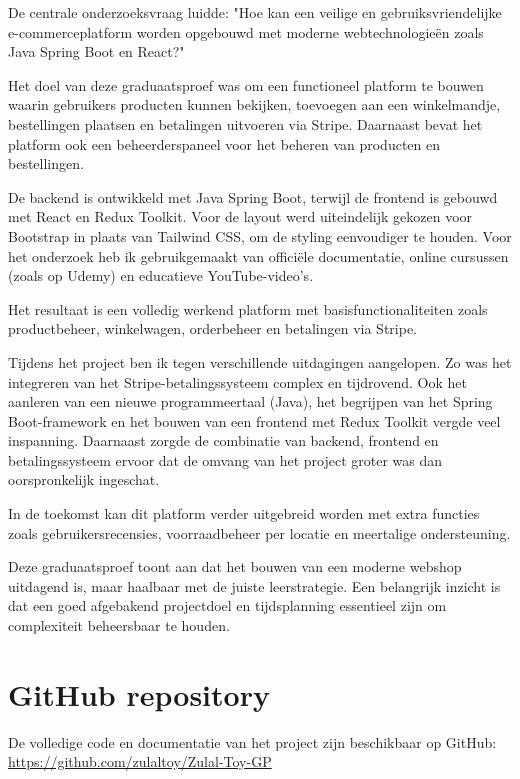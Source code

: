 De centrale onderzoeksvraag luidde: "Hoe kan een veilige en gebruiksvriendelijke e-commerceplatform worden opgebouwd met moderne webtechnologieën zoals Java Spring Boot en React?"

Het doel van deze graduaatsproef was om een functioneel platform te bouwen waarin gebruikers producten kunnen bekijken, toevoegen aan een winkelmandje, bestellingen plaatsen en betalingen uitvoeren via Stripe. Daarnaast bevat het platform ook een beheerderspaneel voor het beheren van producten en bestellingen.

De backend is ontwikkeld met Java Spring Boot, terwijl de frontend is gebouwd met React en Redux Toolkit. Voor de layout werd uiteindelijk gekozen voor Bootstrap in plaats van Tailwind CSS, om de styling eenvoudiger te houden. Voor het onderzoek heb ik gebruikgemaakt van officiële documentatie, online cursussen (zoals op Udemy) en educatieve YouTube-video’s.

Het resultaat is een volledig werkend platform met basisfunctionaliteiten zoals productbeheer, winkelwagen, orderbeheer en betalingen via Stripe. 

Tijdens het project ben ik tegen verschillende uitdagingen aangelopen. Zo was het integreren van het Stripe-betalingssysteem complex en tijdrovend. Ook het aanleren van een nieuwe programmeertaal (Java), het begrijpen van het Spring Boot-framework en het bouwen van een frontend met Redux Toolkit vergde veel inspanning. Daarnaast zorgde de combinatie van backend, frontend en betalingssysteem ervoor dat de omvang van het project groter was dan oorspronkelijk ingeschat.

In de toekomst kan dit platform verder uitgebreid worden met extra functies zoals gebruikersrecensies, voorraadbeheer per locatie en meertalige ondersteuning.

Deze graduaatsproef toont aan dat het bouwen van een moderne webshop uitdagend is, maar haalbaar met de juiste leerstrategie. Een belangrijk inzicht is dat een goed afgebakend projectdoel en tijdsplanning essentieel zijn om complexiteit beheersbaar te houden.

\chapter{GitHub repository}

De volledige code en documentatie van het project zijn beschikbaar op GitHub:\\\url{https://github.com/zulaltoy/Zulal-Toy-GP}
